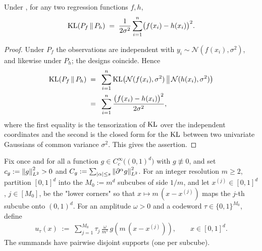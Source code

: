 \begin{fact}\label{fac:gauss-kl}
Under , for any two regression functions $f,h$,
\begin{align}\label{eq:gauss-kl}
\mathrm{KL}\!\left(P_{f}\,\middle\|\,P_{h}\right)
\;=\; \frac{1}{2\sigma^2}\sum_{i=1}^{n}\bigl(f(x_i)-h(x_i)\bigr)^2.
\end{align}
\end{fact}
\begin{proof}
Under $P_f$ the observations are independent with $y_i\sim\mathcal{N}(f(x_i),\sigma^2)$,
and likewise under $P_h$; the designs coincide. Hence
\begin{align*}
\mathrm{KL}\!\left(P_{f}\,\middle\|\,P_{h}\right)
\;=\; & ~ \sum_{i=1}^{n}\mathrm{KL}\!\left(\mathcal{N}(f(x_i),\sigma^2)\,\middle\|\,\mathcal{N}(h(x_i),\sigma^2)\right) \\
\;=\; & ~ \sum_{i=1}^{n}\frac{\bigl(f(x_i)-h(x_i)\bigr)^2}{2\sigma^2},
\end{align*}
where the first equality is the tensorization of $\mathrm{KL}$ over the independent
coordinates and the second is the closed form for the $\mathrm{KL}$ between two
univariate Gaussians of common variance $\sigma^2$. This gives the assertion.
\end{proof}

\begin{definition}\label{def:bumps}
Fix once and for all a function $g\in C^\infty_c\bigl((0,1)^d\bigr)$ with
$g\not\equiv 0$, and set
$c_g := \left\| g \right\|_{L^{2}}^2 > 0$ and
$C_g := \sum_{|\alpha|\le s}\left\| \partial^{\alpha}g \right\|_{L^{2}}^2$.
For an integer resolution $m\ge 2$, partition $[0,1]^d$ into the $M_0 := m^d$
subcubes of side $1/m$, and let $x^{(j)}\in[0,1]^d$, $j\in[M_0]$, be the
"lower corners" so that $x\mapsto m\,(x-x^{(j)})$ maps the $j$-th subcube onto
$(0,1)^d$. For an amplitude $\omega>0$ and a codeword $\tau\in\{0,1\}^{M_0}$,
define
\begin{align}\label{eq:bump}
u_{\tau}(x) \;:=\; \sum_{j=1}^{M_0} \tau_j\,\frac{\omega}{m^{s}}\,
g\!\left(m\,(x-x^{(j)})\right), \qquad x\in[0,1]^d.
\end{align}
The summands have pairwise disjoint supports (one per subcube).
\end{definition}
